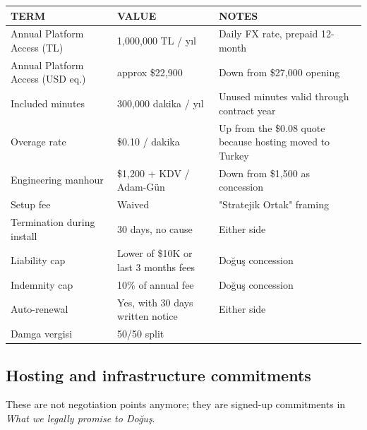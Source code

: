 \documentclass[10pt,a4paper]{article}
\begin{document}
\begin{tabularx}{\linewidth}{@{}L{5.5cm}L{4.5cm}X@{}}
\toprule
{}\textbf{\color{white}\footnotesize TERM} & \textbf{\color{white}\footnotesize VALUE} & \textbf{\color{white}\footnotesize NOTES} \\
\midrule
Annual Platform Access (TL)        & 1{,}000{,}000 TL / yıl    & Daily FX rate, prepaid 12-month \\
Annual Platform Access (USD eq.)   & approx  \$22{,}900             & Down from \$27{,}000 opening \\
Included minutes                   & 300{,}000 dakika / yıl    & Unused minutes valid through contract year \\
Overage rate                       & \$0.10 / dakika            & Up from the \$0.08 quote because hosting moved to Turkey \\
Engineering manhour                & \$1{,}200 + KDV / Adam-Gün & Down from \$1{,}500 as concession \\
Setup fee                          & Waived                     & "Stratejik Ortak" framing \\
Termination during install         & 30 days, no cause          & Either side \\
Liability cap                      & Lower of \$10K or last 3 months fees & Doğuş concession \\
Indemnity cap                      & 10\% of annual fee         & Doğuş concession \\
Auto-renewal                       & Yes, with 30 days written notice & Either side \\
Damga vergisi                      & 50/50 split                & \\
\bottomrule
\end{tabularx}

\subsection{Hosting and infrastructure commitments}

These are not negotiation points anymore; they are signed-up commitments in \emph{What we legally promise to Doğuş}.
\end{document}
